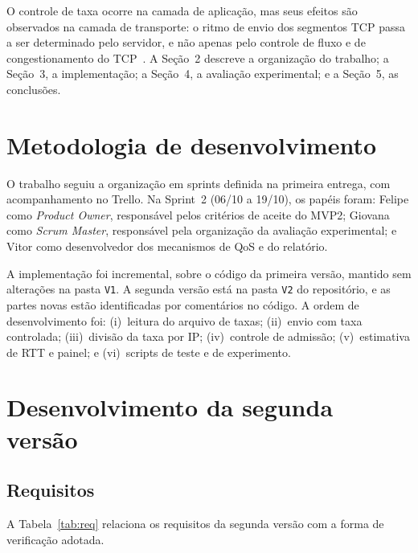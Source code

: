 \documentclass[12pt,a4paper]{article}
\begin{document}
O controle de taxa ocorre na camada de aplicação, mas seus efeitos são observados na
camada de transporte: o ritmo de envio dos segmentos TCP passa a ser determinado pelo
servidor, e não apenas pelo controle de fluxo e de congestionamento do
TCP~\cite{forouzan}. A Seção~2 descreve a organização do trabalho; a Seção~3, a
implementação; a Seção~4, a avaliação experimental; e a Seção~5, as conclusões.

\section{Metodologia de desenvolvimento}

O trabalho seguiu a organização em sprints definida na primeira entrega, com
acompanhamento no Trello. Na Sprint~2 (06/10 a 19/10), os papéis foram: Felipe como
\emph{Product Owner}, responsável pelos critérios de aceite do MVP2; Giovana como
\emph{Scrum Master}, responsável pela organização da avaliação experimental; e Vitor como
desenvolvedor dos mecanismos de QoS e do relatório.

A implementação foi incremental, sobre o código da primeira versão, mantido sem alterações
na pasta \texttt{V1}. A segunda versão está na pasta \texttt{V2} do repositório, e as
partes novas estão identificadas por comentários no código. A ordem de desenvolvimento
foi: (i)~leitura do arquivo de taxas; (ii)~envio com taxa controlada; (iii)~divisão da
taxa por IP; (iv)~controle de admissão; (v)~estimativa de RTT e painel; e (vi)~scripts de
teste e de experimento.

\section{Desenvolvimento da segunda versão}

\subsection{Requisitos}

A Tabela~\ref{tab:req} relaciona os requisitos da segunda versão com a forma de
verificação adotada.
\end{document}
